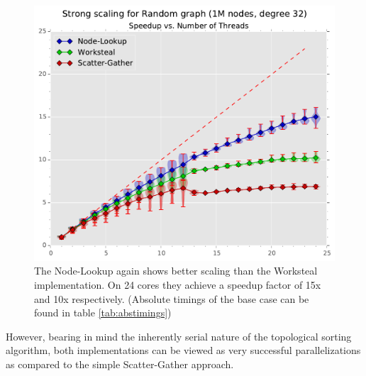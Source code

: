 \begin{figure}[ht]
	\centering
	\includegraphics[width=\columnwidth]{plots/strongscaling_gtRANDOMLIN_n1000000_deg32.pdf}
	\caption{The Node-Lookup again shows better scaling than the Worksteal implementation. On 24 cores they achieve a speedup factor of 15x and 10x respectively. (Absolute timings of the base case can be found in table \ref{tab:abstimings})}
	\label{fig:strongscaling}
\end{figure}
%
However, bearing in mind the inherently serial nature of the topological sorting algorithm, both implementations can be viewed as very successful parallelizations as compared to the simple Scatter-Gather approach.



